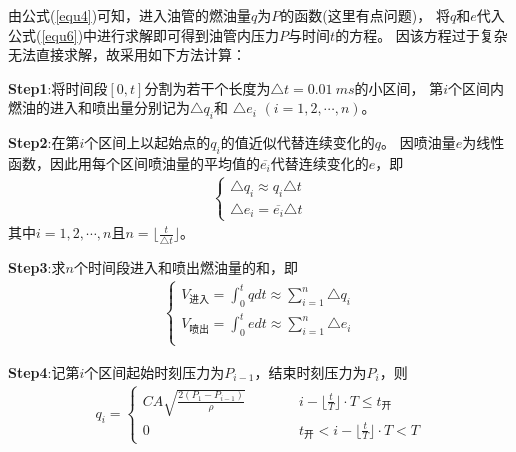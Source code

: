 \documentclass[withoutpreface,bwprint]{cumcmthesis} %
\begin{document}
    由公式(\ref{equ4})可知，进入油管的燃油量$q$为$P$的函数({\color{red}这里有点问题})，
    将$q$和$e$代入公式(\ref{equ6})中进行求解即可得到油管内压力$P$与时间$t$的方程。
    因该方程过于复杂无法直接求解，故采用如下方法计算：
    
    \textbf{Step1}:将时间段$[0,t]$分割为若干个长度为$\triangle t=0.01~ms$的小区间，
    第$i$个区间内燃油的进入和喷出量分别记为$\triangle q_i$和 $\triangle e_i$
    $(i=1,2,\cdots,n)$。

    \textbf{Step2}:在第$i$个区间上以起始点的$q_i$的值近似代替连续变化的$q$。
    因喷油量$e$为线性函数，因此用每个区间喷油量的平均值的$\overline{e_i}$代替连续变化的$e$，即
    \begin{eqnarray}
        \begin{cases}
            \triangle q_i \approx q_i\triangle t\\
            \triangle e_i = \overline{e_i}\triangle t
        \end{cases}
    \label{equ8}
    \end{eqnarray}
    其中$i=1,2,\cdots,n$且$n=\lfloor{\frac{t}{\triangle t}}\rfloor$。
    
    \textbf{Step3}:求$n$个时间段进入和喷出燃油量的和，即
    \begin{eqnarray}
        \begin{cases}
            V_{\text{进入}}=\int_0^t q dt \approx
             \sum\limits_{i=1}^n \triangle q_i \\
            V_{\text{喷出}}=\int_0^t e dt \approx
             \sum\limits_{i=1}^n \triangle e_i \\
        \end{cases}
    \label{equ9}
    \end{eqnarray}

    \textbf{Step4}:记第$i$个区间起始时刻压力为$P_{i-1}$，结束时刻压力为$P_i$，则
    \begin{eqnarray}
        q_i=
        \begin{cases}
        CA\sqrt{\frac{2(P_1-P_{i-1})}{\rho}} \quad \quad  \quad
        & i-\lfloor{\frac{t}{T}}\rfloor \cdot T \leq t_{\text{开}}\\
        0 & t_{\text{开}} < i-\lfloor{\frac{t}{T}}\rfloor \cdot T < T
        \end{cases}
    \label{equ10}
    \end{eqnarray}
\end{document}
